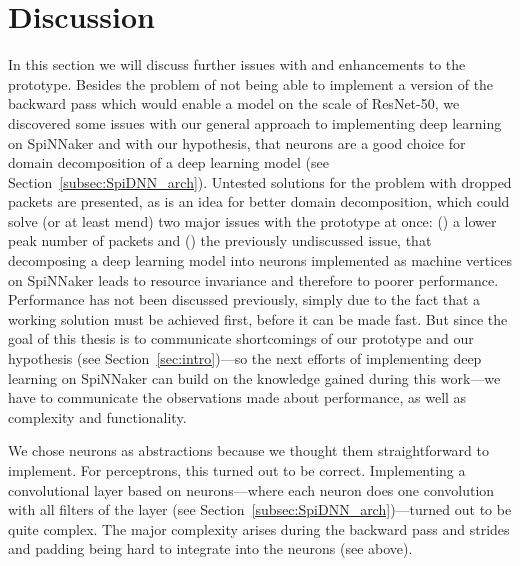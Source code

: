 \documentclass[]{article}
\begin{document}



\section{Discussion} %
\label{sec:discussion}

In this section we will discuss further issues with and enhancements
to the prototype.
Besides the problem of not being able to implement a version of the
backward pass which would enable a model on the scale of ResNet-50,
we discovered some issues with our general approach to implementing
deep learning on SpiNNaker and with our hypothesis, that neurons
are a good choice for domain decomposition of a deep learning model
(see Section~\ref{subsec:SpiDNN_arch}).
Untested solutions for the problem with dropped packets are presented,
as is an idea for better domain decomposition, which could solve (or
at least mend) two major issues with the prototype at once:
() a lower peak number of packets and ()
the previously undiscussed issue, that decomposing a deep learning
model into neurons implemented as machine vertices on SpiNNaker leads
to resource invariance and therefore to poorer performance.
Performance has not been discussed previously, simply due to the
fact that a working solution must be achieved first, before it can
be made fast.
But since the goal of this thesis is to communicate shortcomings of
our prototype and our hypothesis (see Section~\ref{sec:intro})---so
the next efforts of implementing deep learning on SpiNNaker can build
on the knowledge gained during this work---we have to communicate the
observations made about performance, as well as complexity and
functionality.

We chose neurons as abstractions because we thought them
straightforward to implement.
For perceptrons, this turned out to be correct.
Implementing a convolutional layer based on neurons---where each
neuron does one convolution with all filters of the layer
(see Section~\ref{subsec:SpiDNN_arch})---turned out to be quite
complex.
The major complexity arises during the backward pass and strides and
padding being hard to integrate into the neurons (see above).
\end{document}
